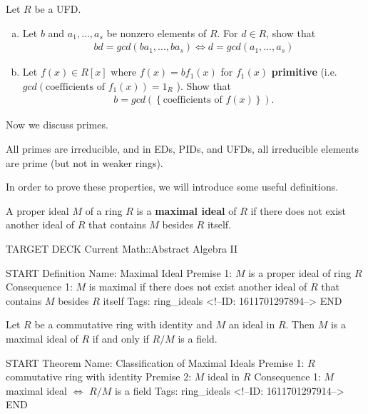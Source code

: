 \documentclass{memoir}
\begin{document}
\begin{hw}
	Let \(R\) be a UFD.
	\begin{enumerate}[(a).]
		\item Let \(b\) and \(a_1,\ldots,a_s\) be nonzero elements of \(R\). For \(d \in R\), show that
			\begin{align*}
				bd = gcd(ba_1,\ldots,ba_s) \iff d = gcd(a_1,\ldots,a_s)
			\end{align*}
		\item Let \(f(x) \in R[x]\) where \(f(x) = bf_1(x)\) for \(f_1(x)\) \textbf{primitive} (i.e. \(gcd(\text{coefficients of }f_1(x)) = 1_R\) ). Show that
			\begin{align*}
				b = gcd(\left\{ \text{coefficients of }f(x) \right\} ).
			\end{align*}
	\end{enumerate}
\end{hw}
Now we discuss primes.
\begin{prop}
	All primes are irreducible, and in EDs, PIDs, and UFDs, all irreducible elements are prime (but not in weaker rings).
\end{prop}
In order to prove these properties, we will introduce some useful definitions.

\begin{defn}
	A proper ideal \(M\) of a ring \(R\) is a \textbf{maximal ideal} of \(R\) if there does not exist another ideal of \(R\) that contains \(M\) besides \(R\) itself.
\end{defn}

\begin{anki}
TARGET DECK
Current Math::Abstract Algebra II

START
Definition
Name: Maximal Ideal
Premise 1: \(M\) is a proper ideal of ring \(R\)
Consequence 1: \(M\) is maximal if there does not exist another ideal of \(R\) that contains \(M\) besides \(R\) itself
Tags: ring_ideals
<!--ID: 1611701297894-->
END
\end{anki}

\begin{thm}
	Let \(R\) be a commutative ring with identity and \(M\) an ideal in \(R\). Then \(M\) is a maximal ideal of \(R\) if and only if \(R / M\) is a field.
\end{thm}

\begin{anki}
START
Theorem
Name: Classification of Maximal Ideals
Premise 1: \(R\) commutative ring with identity
Premise 2: \(M\) ideal in \(R\)
Consequence 1: \(M\) maximal ideal \(\iff\) \(R/M\) is a field
Tags: ring_ideals
<!--ID: 1611701297914-->
END
\end{anki}
\end{document}
